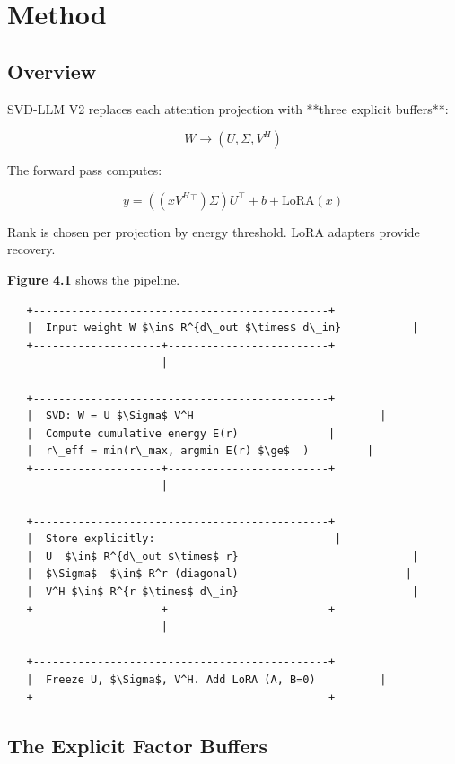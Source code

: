 
\section{Method}

\subsection{Overview}

SVD-LLM V2 replaces each attention projection with **three explicit 
buffers**:

\[
W \to (U, \Sigma, V^H)
\tag{4.1}
\]

The forward pass computes:

\[
y = ((x V^H{}^\top) \Sigma) U^\top + b + \text{LoRA}(x)
\tag{4.2}
\]

Rank is chosen per projection by energy threshold. LoRA adapters provide 
recovery.

\textbf{Figure 4.1} shows the pipeline.

\begin{lstlisting}
   +----------------------------------------------+
   |  Input weight W $\in$ R^{d\_out $\times$ d\_in}           |
   +--------------------+-------------------------+
                        |
                         
   +----------------------------------------------+
   |  SVD: W = U $\Sigma$ V^H                             |
   |  Compute cumulative energy E(r)              |
   |  r\_eff = min(r\_max, argmin E(r) $\ge$  )         |
   +--------------------+-------------------------+
                        |
                         
   +----------------------------------------------+
   |  Store explicitly:                            |
   |  U  $\in$ R^{d\_out $\times$ r}                           |
   |  $\Sigma$  $\in$ R^r (diagonal)                          |
   |  V^H $\in$ R^{r $\times$ d\_in}                           |
   +--------------------+-------------------------+
                        |
                         
   +----------------------------------------------+
   |  Freeze U, $\Sigma$, V^H. Add LoRA (A, B=0)          |
   +----------------------------------------------+
\end{lstlisting}

\subsection{The Explicit Factor Buffers}

